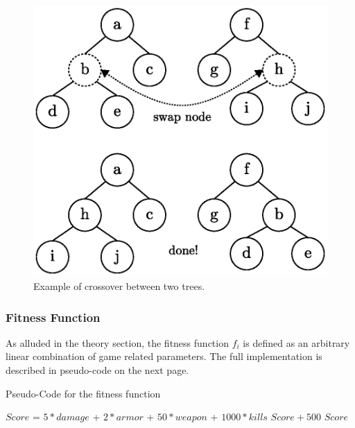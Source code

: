 \documentclass[a4paper, twocolumn]{article}
\begin{document}
        \begin{figure}[H]
            \centering
            \includegraphics[width=\linewidth]{share/node_swapping.eps}
            \caption{Example of crossover between two trees.}
            \label{fig:child_crossover}
        \end{figure}

        \subsubsection*{Fitness Function}
        As alluded in the theory section, the fitness function \(f_i\) is defined as an arbitrary linear combination of game related parameters. The full implementation is described in pseudo-code on the next page.
        \vspace{-0.4em}

        \begin{algorithm}[H]
            \caption{Pseudo-Code for the fitness function}
            \label{alg:fitness_function}
            \begin{algorithmic}
                $Score$ = $5 *damage$ + $2 * armor$ + $50 * weapon$ + $1000 * kills$
                    \RETURN $Score + 500$
                \ELSE
                    \RETURN $Score$
                \ENDIF
            \end{algorithmic}
        \end{algorithm}
        \vspace{-0.6em}
\end{document}
